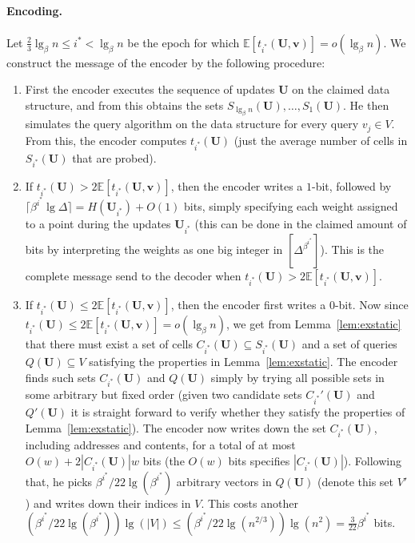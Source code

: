 \documentclass[letterpaper]{article}
\newcommand{\E}{\mathbb{E}}
\newcommand{\is}{{i^*}}
\newcommand{\U}{\textbf{U}}
\newcommand{\vs}{\textbf{v}}
\begin{document}
\paragraph{Encoding.}
Let $\tfrac{2}{3} \lg_\beta n \leq \is < \lg_\beta n$ be the epoch for
which $\E[t_\is(\U,\vs)] = o(\lg_\beta n)$. We construct the message
of the encoder by the following procedure:
\begin{enumerate}
\item First the encoder executes the sequence of updates $\U$ on the
  claimed data structure, and from this obtains the sets $S_{\lg_\beta
    n}(\U),\dots,S_1(\U)$. He then simulates the query algorithm on
  the data structure for every query $v_j \in V$. From this, the
  encoder computes $t_\is(\U)$ (just the average number of cells in
  $S_\is(\U)$ that are probed).
\item If $t_\is(\U) > 2\E[t_\is(\U,\vs)]$, then the encoder writes a
  $1$-bit, followed by $\lceil \beta^\is \lg \Delta\rceil =
  H(\U_\is)+O(1)$ bits, simply specifying each weight assigned to a
  point during the updates $\U_\is$ (this can be done in the claimed
  amount of bits by interpreting the weights as one big integer in
  $[\Delta^{\beta^\is}]$).  This is the complete message send to the
  decoder when $t_\is(\U) > 2\E[t_\is(\U,\vs)]$.
\item If $t_\is(\U) \leq 2\E[t_\is(\U,\vs)]$, then the encoder first
  writes a $0$-bit. Now since $t_\is(\U) \leq 2\E[t_\is(\U,\vs)] =
  o(\lg_\beta n)$, we get from Lemma~\ref{lem:exstatic} that there
  must exist a set of cells $C_\is(\U) \subseteq S_\is(\U)$ and a set
  of queries $Q(\U) \subseteq V$ satisfying the properties in
  Lemma~\ref{lem:exstatic}. The encoder finds such sets $C_\is(\U)$
  and $Q(\U)$ simply by trying all possible sets in some arbitrary but
  fixed order (given two candidate sets $C_\is'(\U)$ and $Q'(\U)$ it
  is straight forward to verify whether they satisfy the properties of
  Lemma~\ref{lem:exstatic}). The encoder now writes down the set
  $C_\is(\U)$, including addresses and contents, for a total of at
  most $O(w)+2|C_\is(\U)|w$ bits (the $O(w)$ bits specifies
  $|C_\is(\U)|$). Following that, he picks
  $\beta^\is/22\lg(\beta^\is)$ arbitrary vectors in $Q(\U)$ (denote
  this set $V'$) and writes down their indices in $V$. This costs
  another $(\beta^\is/22\lg(\beta^\is))\lg(|V|) \leq
  (\beta^\is/22\lg(n^{2/3}))\lg(n^2) = \tfrac{3}{22}\beta^\is$ bits.


\end{enumerate}
\end{document}
